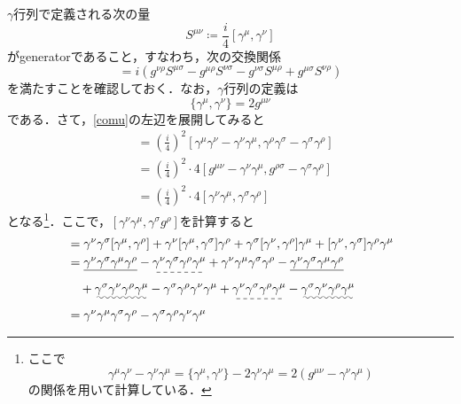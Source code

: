 \documentclass[a4paper,pdflatex,ja=standard]{bxjsarticle}
\newcommand{\gam}[4]{
  \gamma^{#1}\gamma^{#2}\gamma^{#3}\gamma^{#4}
}
\begin{document}
$\gamma$行列で定義される次の量
\begin{equation}
  S^{\mu\nu}
  \coloneqq
  \frac{i}{4}[\gamma^{\mu},\gamma^{\nu}]
\end{equation}
がgeneratorであること，すなわち，次の交換関係
\begin{equation}
  [S^{\mu\nu},S^{\rho\sigma}]
  =
  i(
    g^{\nu\rho}S^{\mu\sigma}
    -
    g^{\mu\rho}S^{\nu\sigma}
    -
    g^{\nu\sigma}S^{\mu\rho}
    +
    g^{\mu\sigma}S^{\nu\rho}
  )
  \label{comu}
\end{equation}
を満たすことを確認しておく．なお，$\gamma$行列の定義は
\begin{equation}
  \{
    \gamma^{\mu},\gamma^{\nu}
  \}
  =
  2g^{\mu\nu}
\end{equation}
である．さて，\eqref{comu}の左辺を展開してみると
\begin{align}
  [S^{\mu\nu},S^{\rho\sigma}]
  &=
  \left( \frac{i}{4} \right)^{2}
  [
    \gamma^{\mu}\gamma^{\nu}-\gamma^{\nu}\gamma^{\mu}
    ,
    \gamma^{\rho}\gamma^{\sigma}-\gamma^{\sigma}\gamma^{\rho}
  ]
  \nonumber
  \\
  &=
  \left( \frac{i}{4} \right)^{2} \cdot 4
  [
    g^{\mu\nu}-\gamma^{\nu}\gamma^{\mu}
    ,
    g^{\rho\sigma}-\gamma^{\sigma}\gamma^{\rho}
  ]
  \nonumber
  \\
  &=
  \left( \frac{i}{4} \right)^{2} \cdot 4
  [
    \gamma^{\nu}\gamma^{\mu}
    ,
    \gamma^{\sigma}\gamma^{\rho}
  ]
  \label{foo}
\end{align}
となる\footnote{
  ここで
  $$
  \gamma^{\mu}\gamma^{\nu}-\gamma^{\nu}\gamma^{\mu}
  =
  \{\gamma^{\mu},\gamma^{\nu}\}-2\gamma^{\nu}\gamma^{\mu}
  =
  2(g^{\mu\nu}-\gamma^{\nu}\gamma^{\mu})
  $$
  の関係を用いて計算している．
}．ここで，$[
  \gamma^{\nu}\gamma^{\mu}
  ,
  \gamma^{\sigma}g^{\rho}
]$を計算すると
\begin{align}
  [
  \gamma^{\nu}\gamma^{\mu}
  ,
  \gamma^{\sigma}\gamma^{\rho}
  ]
  &=
  \gamma^{\nu}\gamma^{\sigma}
  [
  \gamma^{\mu}
  ,
  \gamma^{\rho}
  ]
  +
  \gamma^{\nu}
  [
  \gamma^{\mu}
  ,
  \gamma^{\sigma}
  ]
  \gamma^{\rho}
  +
  \gamma^{\sigma}
  [
  \gamma^{\nu}
  ,
  \gamma^{\rho}
  ]
  \gamma^{\mu}
  +
  [
  \gamma^{\nu}
  ,
  \gamma^{\sigma}
  ]
  \gamma^{\rho}\gamma^{\mu}
  \nonumber
  \\
  &=
  \uline{
    \gam{\nu}{\sigma}{\mu}{\rho}
  }
  -
  \dashuline{
    \gam{\nu}{\sigma}{\rho}{\mu}
  }
  +
  \gam{\nu}{\mu}{\sigma}{\rho}
  -
  \uline{
    \gam{\nu}{\sigma}{\mu}{\rho}
  }
  \nonumber
  \\
  &\quad
  +
  \uwave{
    \gam{\sigma}{\nu}{\rho}{\mu}
  }
  -
  \gam{\sigma}{\rho}{\nu}{\mu}
  +
  \dashuline{
    \gam{\nu}{\sigma}{\rho}{\mu}
  }
  -
  \uwave{
    \gam{\sigma}{\nu}{\rho}{\mu}
  }
  \nonumber
  \\
  &=
  \gam{\nu}{\mu}{\sigma}{\rho}
  -
  \gam{\sigma}{\rho}{\nu}{\mu}
  \label{rarara}
\end{align}
\end{document}
